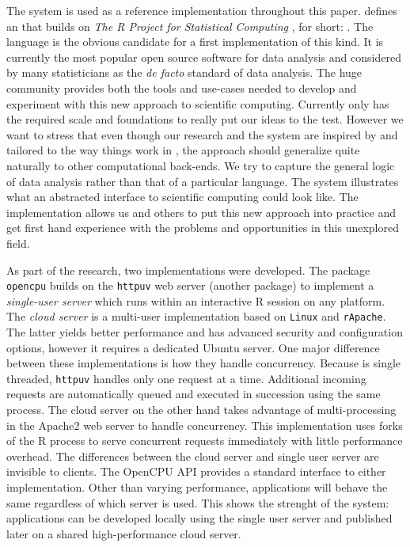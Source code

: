 The \OpenCPU system is used as a reference implementation throughout this paper. \OpenCPU defines an \HTTP \API that builds on \emph{The R Project for Statistical Computing} \citep{R}, for short: \R. The \R language is the obvious candidate for a first implementation of this kind. It is currently the most popular open source software for data analysis and considered by many statisticians as the \emph{de facto} standard of data analysis. The huge \R community provides both the tools and use-cases needed to develop and experiment with this new approach to scientific computing. Currently only \R has the required scale and foundations to really put our ideas to the test. However we want to stress that even though our research and the \OpenCPU system are inspired by and tailored to the way things work in \R, the approach should generalize quite naturally to other computational back-ends. We try to capture the general logic of data analysis rather than that of a particular language. The \OpenCPU system illustrates what an abstracted interface to scientific computing could look like. The implementation allows us and others to put this new approach into practice and get first hand experience with the problems and opportunities in this unexplored field. 



As part of the research, two implementations were developed. The \R package \texttt{opencpu} builds on the \texttt{httpuv} web server (another \R package) to implement a \emph{single-user server} which runs within an interactive R session on any platform. The \emph{cloud server} is a multi-user implementation based on \texttt{Linux} and \texttt{rApache}. The latter yields better performance and has advanced security and configuration options, however it requires a dedicated Ubuntu server. One major difference between these implementations is how they handle concurrency. Because \R is single threaded, \texttt{httpuv} handles only one request at a time. Additional incoming requests are automatically queued and executed in succession using the same process. The cloud server on the other hand takes advantage of multi-processing in the Apache2 web server to handle concurrency. This implementation uses forks of the R process to serve concurrent requests immediately with little performance overhead. The differences between the cloud server and single user server are invisible to clients. The OpenCPU API provides a standard interface to either implementation. Other than varying performance, applications will behave the same regardless of which server is used. This shows the strenght of the system: applications can be developed locally using the single user server and published later on a shared high-performance cloud server.


